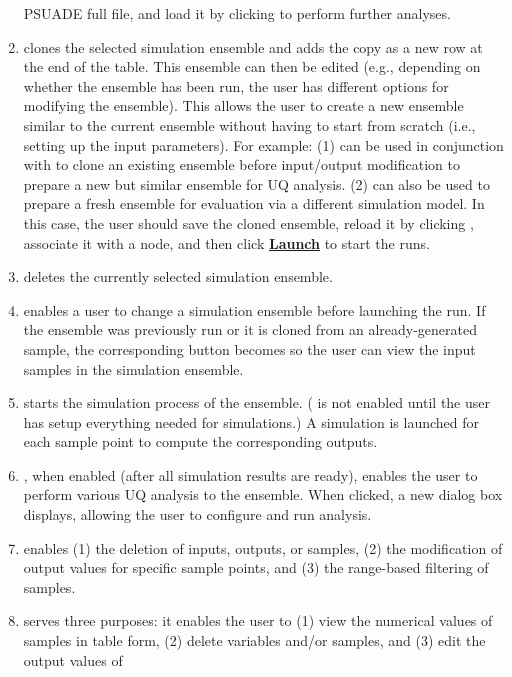 \begin{enumerate}
 	PSUADE full file, and load it by clicking  to perform
 	further analyses. 
\item
	 clones the selected simulation ensemble and adds the
	copy as a new row at the end of the table. This ensemble can then be
	edited (e.g., depending on whether the ensemble has been run, the user
	has different options for modifying the ensemble). 
   This allows the user to create a new ensemble similar to
	the current ensemble without having to start from scratch (i.e., setting
	up the input parameters). For example: (1)  can be used in
	conjunction with  to clone an existing ensemble
	before input/output modification to prepare a new but similar
	ensemble for UQ analysis. (2)  can also be used to
	prepare a fresh ensemble for evaluation via a different simulation
	model. In this case, the user should save the cloned ensemble,
	reload it by clicking , associate it with a node, and then
	click \textbf{\underline{Launch}} to start the runs. 
\item
	 deletes the currently selected simulation ensemble.
\item
	 enables a user to change a simulation ensemble before launching
	the run. If the ensemble was previously run or it is cloned from an
	already-generated sample, the corresponding button becomes  so
	the user can view the input samples in the simulation ensemble. 
\item
	 starts the simulation process of the ensemble. (
	is not enabled until the user has setup everything needed for
	simulations.) A simulation is launched for each sample point to compute
	the corresponding outputs.
\item
	, when enabled (after all simulation results are ready),
   enables the user to perform various UQ analysis to the ensemble.  When
   clicked, a new dialog box displays, allowing the user to configure and
   run analysis.
\item
	 enables (1) the deletion of inputs, outputs, or samples, 
	(2) the	modification of output values for specific sample points, and 
	(3) the range-based filtering of samples.
\item
	 serves three purposes: 
	it enables the user to (1) view the numerical values of samples in table form, 
	(2) delete variables and/or samples, and (3) edit the output values of 

\end{enumerate}
